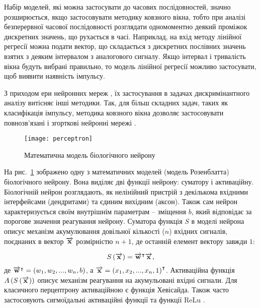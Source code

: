 
Набір моделей, які можна застосувати до часових послідовностей, значно 
розширюється, якщо застосовувати методику ковзного вікна, тобто при аналізі 
безперервної часової послідовності розглядати одномоментно деякий проміжок 
дискретних значень, що рухається в часі. Наприклад, на вхід методу лінійної 
регресії \cite{imp:Xin2009} можна подати вектор, що складається з дискретних 
послівних значень взятих з деяким інтервалом з аналогового сигналу. Якщо 
інтервал і тривалість вікна будуть вибрані правильно, то модель лінійної
регресії можливо застосувати, щоб виявити наявність імпульсу. 

З приходом ери нейронних мереж \cite{imp:Rosenblatt1957}, їх застосування в
задачах дискримінантного аналізу витісняє інші методики. Так, для більш 
складних задач, таких як класифікація імпульсу, методика ковзного вікна 
дозволяє застосовувати повнозв'язані і згорткові нейронні мережі 
\cite{imp:Plakhtii2019}.

\begin{figure}[htbp] \begin{center}
\texttt{[image: perceptron]}
\caption{Математична модель біологічного нейрону}
\label{fig:perceptron}
\end{center} \end{figure}

На рис.~\ref{fig:perceptron} зображено одну з математичних моделей (модель 
Розенблатта) біологічного нейрону. Вона виділяє дві функції нейрону: суматору 
і активаційну. Біологічній нейрон розглядають, як нелінійний пристрій з 
декількома вхідними інтерфейсами (дендритами) та єдиним вихідним (аксон).
Також сам нейрон характеризується своїм внутрішнім параметрам -- зміщення 
$ b $, який відповідає за порогове значення реагування нейрону. Суматора 
функція $ S $ в моделі нейрона описує механізм акумулювання довільної 
кількості ($ n $) вхідних сигналів, поєднаних в вектор $ \overrightarrow{\mathbf x} $ 
розмірністю $ n + 1 $, де останній елемент вектору завжди $ 1 $:

\begin{equation}
S \left( \overrightarrow{\mathbf x} \right) = \overrightarrow{\mathbf w}^\intercal \overrightarrow{\mathbf x},
\end{equation}
%
де $ \overrightarrow{\mathbf w}^\intercal = \left( w_1, w_2, ..., w_n, b \right) $, а
$ \overrightarrow{\mathbf x} = \left( x_1, x_2, ..., x_n, 1 \right)^\intercal $.
Активаційна функція $ A \left( S \left( \overrightarrow{\mathbf x} \right) \right) $ описує механізм 
реагування на акумульовані вхідні сигнали. Для класичного перцептрону 
активаційною є функція Хевісайда. Також часто застосовують сигмоїдальні 
активаційні функції та функції ReLu \cite{imp:Kussul2004}.

